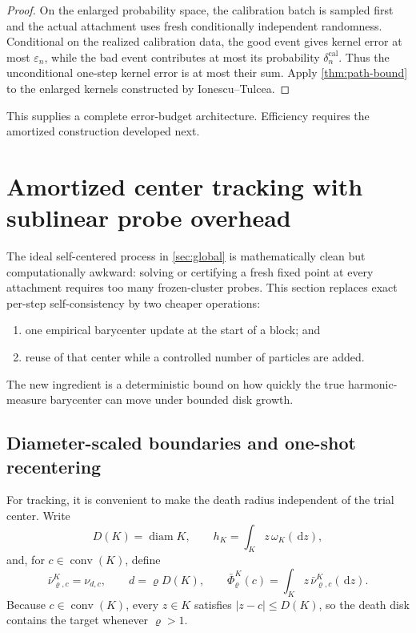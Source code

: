 \documentclass[11pt]{article}
\theoremstyle{mainthm}
\theoremstyle{definition}
\theoremstyle{remark}
\newcommand{\dd}{\,\mathrm d}
\newcommand{\conv}{\operatorname{conv}}
\newcommand{\eps}{\varepsilon}
\begin{document}
\begin{proof}
On the enlarged probability space, the calibration batch is sampled first and the actual attachment uses fresh conditionally independent randomness. Conditional on the realized calibration data, the good event gives kernel error at most $\eps_n$, while the bad event contributes at most its probability $\delta_n^{\mathrm{cal}}$. Thus the unconditional one-step kernel error is at most their sum. Apply \cref{thm:path-bound} to the enlarged kernels constructed by Ionescu--Tulcea.
\end{proof}

This supplies a complete error-budget architecture. Efficiency requires the amortized construction developed next.

\section{Amortized center tracking with sublinear probe overhead}
\label{sec:amortized}

The ideal self-centered process in \cref{sec:global} is mathematically clean but computationally awkward: solving or certifying a fresh fixed point at every attachment requires too many frozen-cluster probes. This section replaces exact per-step self-consistency by two cheaper operations:

\begin{enumerate}
  \item one empirical barycenter update at the start of a block; and
  \item reuse of that center while a controlled number of particles are added.
\end{enumerate}

The new ingredient is a deterministic bound on how quickly the true harmonic-measure barycenter can move under bounded disk growth.

\subsection{Diameter-scaled boundaries and one-shot recentering}

For tracking, it is convenient to make the death radius independent of the trial center. Write
\[
  D(K)=\operatorname{diam}K,
  \qquad
  h_K=\int_K z\,\omega_K(\dd z),
\]
and, for $c\in\conv(K)$, define
\begin{equation}
  \bar\nu_{\varrho,c}^{K}=\nu_{d,c},
  \qquad d=\varrho D(K),
  \qquad
  \bar\Phi_{\varrho}^{K}(c)=\int_K z\,\bar\nu_{\varrho,c}^{K}(\dd z).
  \label{eq:diameter-law}
\end{equation}
Because $c\in\conv(K)$, every $z\in K$ satisfies $|z-c|\le D(K)$, so the death disk contains the target whenever $\varrho>1$.
\end{document}
